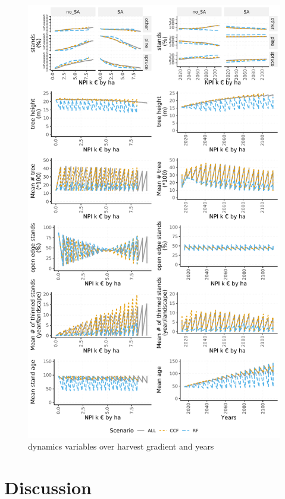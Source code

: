 \documentclass[]{elsarticle} %
\makeatletter
\def\maxwidth{\ifdim\Gin@nat@width>\linewidth\linewidth
\else\Gin@nat@width\fi}
\let\Oldincludegraphics\includegraphics
\renewcommand{\includegraphics}[1]{\Oldincludegraphics[width=\maxwidth]{#1}}
\makeatother
\begin{document}
\begin{figure}
\centering
\includegraphics{test_manus3_files/figure-latex/plot-dynamic-vars-1.pdf}
\caption{\label{fig:plot-dynamic-vars}dynamics variables over harvest gradient and years}
\end{figure}

\hypertarget{discussion}{%
\section{Discussion}\label{discussion}}
\end{document}
